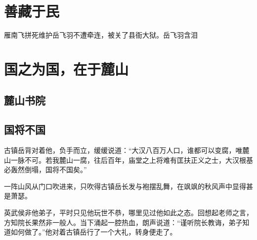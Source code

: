

\chapter{善藏于民}
雁南飞拼死维护岳飞羽不遭牵连，被关了县衙大狱。岳飞羽含泪

\section{}
\section{}
\section{}
\section{}



\chapter{国之为国，在于麓山}
\section{麓山书院}


\section{国将不国}
古镇岳背对着他，负手而立，缓缓说道：“大汉八百万人口，谁都可以变腐，唯麓山一脉不可。若我麓山一腐，往后百年，庙堂之上将难有匡扶正义之士，大汉根基必轰然倒塌，国将不国矣。”

一阵山风从门口吹进来，只吹得古镇岳长发与袍摆乱舞，在飒飒的秋风声中显得甚是萧瑟。

英武侯非他弟子，平时只见他玩世不恭，哪里见过他如此之态。回想起老师之言，方知院长果然非一般人。当下涌起一腔热血，朗声说道：“谨听院长教诲，弟子知道如何做了。”他对着古镇岳行了一个大礼，转身便走了。

\section{}
\section{}

